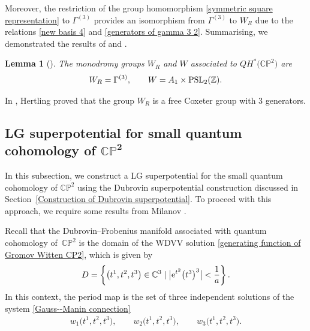 \documentclass[11pt]{article}
\numberwithin{equation}{section}
\numberwithin{equation}{section}
\newtheorem{Lemma}[Theorem]{Lemma}
\begin{document}
 Moreover, the restriction of the group homomorphism \eqref{symmetric square representation} to $\Gamma^{(3)}$ provides an isomorphism from $\Gamma^{(3)}$ to $W_R$ due to the relations \eqref{new basis 4} and \eqref{generators of gamma 3 2}. Summarising, we demonstrated the results of \cite[Section~4.1]{Milanov} and \cite[Theorem~5.5]{B.Dubrovin3}.

 \begin{Lemma}[{\cite{B.Dubrovin3,Milanov}}]\label{Monodromy QHCP2}
 The monodromy groups $W_R$ and $W$ associated to $QH^{*}\bigl(\mathbb{CP}^2\bigr)$ are
 \begin{gather*}
 W_R=\Gamma^{(3)}, \qquad W=A_1\times {\rm PSL}_2(\mathbb{Z}).
 \end{gather*}
\end{Lemma}

\begin{Remark}
In \cite[Theorem 5.12\,(g)]{Hertling2}, Hertling proved that the group $W_R$ is a free Coxeter group with 3 generators.
\end{Remark}

\subsection[LG superpotential for small quantum cohomology of $\mathbb{CP}^2$]{LG superpotential for small quantum cohomology of $\boldsymbol{\mathbb{CP}^2}$}\label{LG superpotential for small Quantum Cohomology}

In this subsection, we construct a LG superpotential for the small quantum cohomology of $\mathbb{CP}^2$ using the Dubrovin superpotential construction discussed in Section~\ref{Construction of Dubrovin superpotential}. To proceed with this approach, we require some results from Milanov \cite[Section~4]{Milanov}.


 Recall that the Dubrovin--Frobenius manifold associated with quantum cohomology of~$\mathbb{CP}^2$ is the domain of the WDVV solution \eqref{generating function of Gromov Witten CP2}, which is given by
 \begin{gather}\label{domain Quantum cohomology 1}
 D=\left\{ \bigl(t^1,t^2,t^3\bigr)\in \mathbb{C}^3\mid \bigl|{\rm e}^{t^2}\bigl(t^3\bigr)^3\bigr|<\frac{1}{a}\right\}.
 \end{gather}
 In this context, the period map is the set of three independent solutions of the system \eqref{Gauss--Manin connection}
\begin{gather}\label{period of quantum cohomology cp2}
w_1\bigl(t^1,t^2,t^3\bigr), \qquad w_2\bigl(t^1,t^2,t^3\bigr), \qquad w_3\bigl(t^1,t^2,t^3\bigr).
\end{gather}
\end{document}
